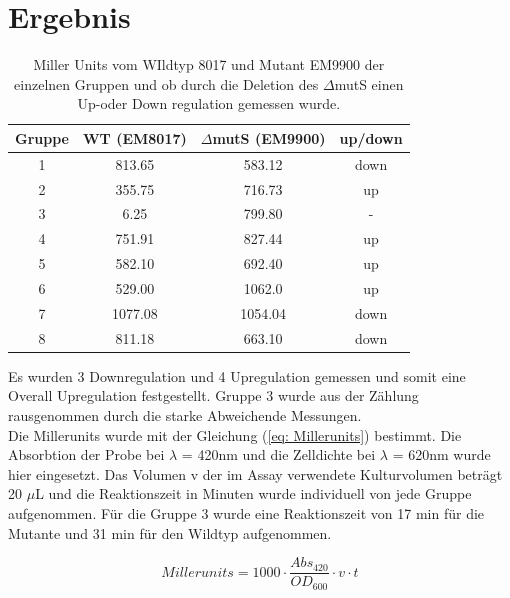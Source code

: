 \documentclass[oneside,10pt,a4paper]{report}
\begin{document}
		\section{Ergebnis}
			\begin{table}[H]
			\centering
			\caption{Miller Units vom WIldtyp 8017 und Mutant EM9900 der einzelnen Gruppen und ob durch die Deletion des $\Delta$mutS einen Up-oder Down regulation gemessen wurde.}
			\label{tab: exp8-millerunits}
			\begin{tabular}{cccc}
				\toprule
				Gruppe& WT (EM8017) & $\Delta$mutS (EM9900)& up/down\\
				\midrule
				1 & 813.65 & 583.12& down\\
				2 & 355.75 & 716.73 & up\\
				3 & 6.25 & 799.80 & - \\
				4 & 751.91 & 827.44 & up\\
				5 & 582.10 & 692.40 & up\\
				6 & 529.00 & 1062.0 & up\\
				7 & 1077.08 & 1054.04 & down\\
				8 & 811.18 & 663.10 & down\\
				\bottomrule			
			\end{tabular}
		\end{table}
		
		Es wurden 3 Downregulation und 4 Upregulation gemessen und somit eine Overall Upregulation festgestellt. Gruppe 3 wurde aus der Zählung rausgenommen durch die starke Abweichende Messungen.\\
		Die Millerunits wurde mit der Gleichung (\ref{eq: Millerunits}) bestimmt. Die Absorbtion der Probe bei $\lambda$ = 420nm und die Zelldichte bei $\lambda$ = 620nm wurde hier eingesetzt.
		Das Volumen v der im Assay verwendete Kulturvolumen beträgt 20 $\mu$L und die Reaktionszeit in Minuten wurde individuell von jede Gruppe aufgenommen. Für die Gruppe 3 wurde eine Reaktionszeit von 17 min für die Mutante und 31 min für den Wildtyp aufgenommen.
		
		\begin{equation}\label{eq: Millerunits}
			Millerunits = 1000 \cdot \frac{Abs_{420}}{OD_{600}} \cdot v \cdot t
		\end{equation}
\end{document}
